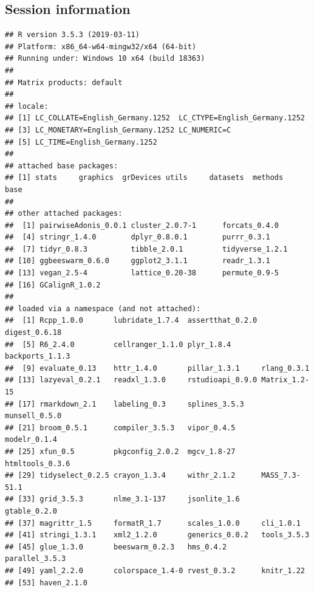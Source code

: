 \documentclass[]{article}
\begin{document}
\subsection{Session information}\label{session-information}

\begin{verbatim}
## R version 3.5.3 (2019-03-11)
## Platform: x86_64-w64-mingw32/x64 (64-bit)
## Running under: Windows 10 x64 (build 18363)
## 
## Matrix products: default
## 
## locale:
## [1] LC_COLLATE=English_Germany.1252  LC_CTYPE=English_Germany.1252   
## [3] LC_MONETARY=English_Germany.1252 LC_NUMERIC=C                    
## [5] LC_TIME=English_Germany.1252    
## 
## attached base packages:
## [1] stats     graphics  grDevices utils     datasets  methods   base     
## 
## other attached packages:
##  [1] pairwiseAdonis_0.0.1 cluster_2.0.7-1      forcats_0.4.0       
##  [4] stringr_1.4.0        dplyr_0.8.0.1        purrr_0.3.1         
##  [7] tidyr_0.8.3          tibble_2.0.1         tidyverse_1.2.1     
## [10] ggbeeswarm_0.6.0     ggplot2_3.1.1        readr_1.3.1         
## [13] vegan_2.5-4          lattice_0.20-38      permute_0.9-5       
## [16] GCalignR_1.0.2      
## 
## loaded via a namespace (and not attached):
##  [1] Rcpp_1.0.0       lubridate_1.7.4  assertthat_0.2.0 digest_0.6.18   
##  [5] R6_2.4.0         cellranger_1.1.0 plyr_1.8.4       backports_1.1.3 
##  [9] evaluate_0.13    httr_1.4.0       pillar_1.3.1     rlang_0.3.1     
## [13] lazyeval_0.2.1   readxl_1.3.0     rstudioapi_0.9.0 Matrix_1.2-15   
## [17] rmarkdown_2.1    labeling_0.3     splines_3.5.3    munsell_0.5.0   
## [21] broom_0.5.1      compiler_3.5.3   vipor_0.4.5      modelr_0.1.4    
## [25] xfun_0.5         pkgconfig_2.0.2  mgcv_1.8-27      htmltools_0.3.6 
## [29] tidyselect_0.2.5 crayon_1.3.4     withr_2.1.2      MASS_7.3-51.1   
## [33] grid_3.5.3       nlme_3.1-137     jsonlite_1.6     gtable_0.2.0    
## [37] magrittr_1.5     formatR_1.7      scales_1.0.0     cli_1.0.1       
## [41] stringi_1.3.1    xml2_1.2.0       generics_0.0.2   tools_3.5.3     
## [45] glue_1.3.0       beeswarm_0.2.3   hms_0.4.2        parallel_3.5.3  
## [49] yaml_2.2.0       colorspace_1.4-0 rvest_0.3.2      knitr_1.22      
## [53] haven_2.1.0
\end{verbatim}
\end{document}
